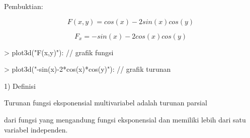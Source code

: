 \documentclass[a4paper,10pt]{article}
\begin{document}
\begin{eulernotebook}
\begin{eulercomment}
\begin{eulercomment}
\begin{eulercomment}
\begin{eulercomment}
\begin{eulercomment}
\begin{eulercomment}
\begin{eulerttcomment}
   Pembuktian:
\end{eulerttcomment}
\begin{eulercomment}
\end{eulercomment}
\begin{eulerformula}
\[
F(x,y) = cos(x) - 2sin(x)cos(y)
\]
\end{eulerformula}
\begin{eulercomment}
\end{eulercomment}
\begin{eulerformula}
\[
F_x = -sin(x) - 2cos(x)cos(y)
\]
\end{eulerformula}
\begin{eulerprompt}
> plot3d("F(x,y)"): // grafik fungsi
\end{eulerprompt}
\begin{eulerprompt}
> plot3d("-sin(x)-2*cos(x)*cos(y)"): // grafik turunan
\end{eulerprompt}
\begin{eulercomment}
\end{eulercomment}
\begin{eulercomment}
1) Definisi\\
\end{eulercomment}
\begin{eulerttcomment}
   Turunan fungsi eksponensial multivariabel adalah turunan parsial
\end{eulerttcomment}
\begin{eulercomment}
dari fungsi yang mengandung fungsi eksponensial dan memiliki lebih
dari satu variabel independen. 


\end{eulercomment}
\end{eulercomment}
\end{eulercomment}
\end{eulercomment}
\end{eulercomment}
\end{eulercomment}
\end{eulercomment}
\end{eulernotebook}
\end{document}
